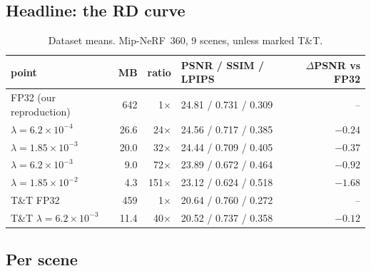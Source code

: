 \documentclass[11pt,a4paper]{article}
\begin{document}
\subsection{Headline: the RD curve}

\begin{table}[h]
\centering\small
\caption{Dataset means. Mip-NeRF~360, 9 scenes, unless marked T\&T.}
\label{tab:headline}
\begin{tabular}{@{}lrrlr@{}}
\toprule
point & MB & ratio & PSNR / SSIM / LPIPS & $\Delta$PSNR vs FP32 \\
\midrule
FP32 (our reproduction) & 642 & 1$\times$ & 24.81 / 0.731 / 0.309 & -- \\
$\lambda = 6.2\times10^{-4}$ & 26.6 & 24$\times$ & 24.56 / 0.717 / 0.385 & $-0.24$ \\
$\lambda = 1.85\times10^{-3}$ & 20.0 & 32$\times$ & 24.44 / 0.709 / 0.405 & $-0.37$ \\
$\lambda = 6.2\times10^{-3}$ & 9.0 & 72$\times$ & 23.89 / 0.672 / 0.464 & $-0.92$ \\
$\lambda = 1.85\times10^{-2}$ & 4.3 & 151$\times$ & 23.12 / 0.624 / 0.518 & $-1.68$ \\
\midrule
T\&T FP32 & 459 & 1$\times$ & 20.64 / 0.760 / 0.272 & -- \\
T\&T $\lambda = 6.2\times10^{-3}$ & 11.4 & 40$\times$ & 20.52 / 0.737 / 0.358 & $-0.12$ \\
\bottomrule
\end{tabular}
\end{table}

\subsection{Per scene}
\end{document}
